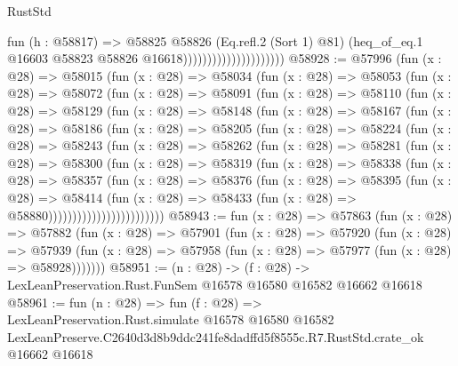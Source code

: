 \begin{lexlean}{RustStd}
\begin{coremodule}
                                          fun (h : @58817) =>
                                          @58825
                                            @58826
                                            (Eq.refl.{2} (Sort 1) @81)
                                            (heq_of_eq.{1}
                                              @16603
                                              @58823
                                              @58826
                                              @16618)))))))))))))))))))))
@58928 := @57996
    (fun (x : @28) =>
    @58015
      (fun (x : @28) =>
      @58034
        (fun (x : @28) =>
        @58053
          (fun (x : @28) =>
          @58072
            (fun (x : @28) =>
            @58091
              (fun (x : @28) =>
              @58110
                (fun (x : @28) =>
                @58129
                  (fun (x : @28) =>
                  @58148
                    (fun (x : @28) =>
                    @58167
                      (fun (x : @28) =>
                      @58186
                        (fun (x : @28) =>
                        @58205
                          (fun (x : @28) =>
                          @58224
                            (fun (x : @28) =>
                            @58243
                              (fun (x : @28) =>
                              @58262
                                (fun (x : @28) =>
                                @58281
                                  (fun (x : @28) =>
                                  @58300
                                    (fun (x : @28) =>
                                    @58319
                                      (fun (x : @28) =>
                                      @58338
                                        (fun (x : @28) =>
                                        @58357
                                          (fun (x : @28) =>
                                          @58376
                                            (fun (x : @28) =>
                                            @58395
                                              (fun (x : @28) =>
                                              @58414
                                                (fun (x : @28) =>
                                                @58433
                                                  (fun (x : @28) => @58880))))))))))))))))))))))))
@58943 := fun (x : @28) =>
  @57863
    (fun (x : @28) =>
    @57882
      (fun (x : @28) =>
      @57901
        (fun (x : @28) =>
        @57920
          (fun (x : @28) =>
          @57939 (fun (x : @28) => @57958 (fun (x : @28) => @57977 (fun (x : @28) => @58928)))))))
@58951 := (n : @28) ->
  (f : @28) -> LexLeanPreservation.Rust.FunSem @16578 @16580 @16582 @16662 @16618
@58961 := fun (n : @28) =>
  fun (f : @28) =>
  LexLeanPreservation.Rust.simulate
    @16578
    @16580
    @16582
    LexLeanPreserve.C2640d3d8b9ddc241fe8dadffd5f8555c.R7.RustStd.crate_ok
    @16662
    @16618
\end{coremodule}
\end{lexlean}
